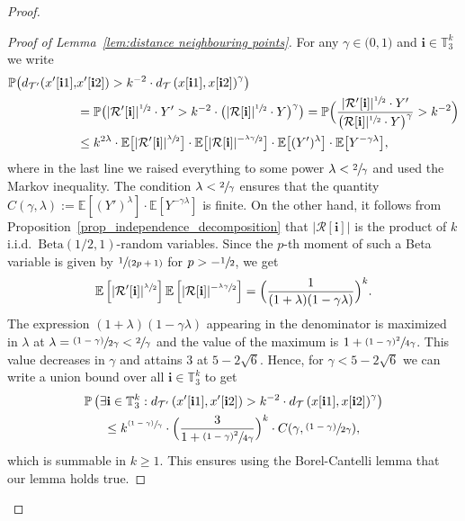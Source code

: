 \documentclass[11pt]{article}
\newcommand{\psfrac}[2]{\sfrac{(#1)}{#2}}
\newcommand{\spfrac}[2]{\sfrac{#1}{(#2)}}
\newcommand{\Ec}[1]{\mathbb{E} \left[#1\right]}
\newcommand{\bEc}[1]{\mathbb{E} \bigl[#1\bigr]}
\newcommand{\Pp}[1]{\mathbb{P} \left(#1\right)}
\newcommand{\bPp}[1]{\mathbb{P} \bigl(#1\bigr)}
\newcommand{\BPp}[1]{\mathbb{P} \Bigl(#1\Bigr)}
\newcommand{\intervalle}[4]{\mathopen{#1}#2\mathclose{}\mathpunct{},#3\mathclose{#4}}
\newcommand{\intervalleoo}[2]{\intervalle{(}{#1}{#2}{)}}
\newcommand{\Tt}{\mathcal{T}}
\newcommand{\ii}{\mathbf{i}}
\theoremstyle{plain}
\theoremstyle{definition}
\numberwithin{equation}{section}
\begin{document}
\begin{proof}
\begin{proof}[Proof of Lemma~\ref{lem:distance neighbouring points}]
For any $\gamma \in \intervalleoo{0}{1}$ and $\ii \in \mathbb{T}_3^k$ we write\vspace*{-3pt}
\begin{align*}
\bPp{d_{\Tt'}( x'[\ii1],&x'[\ii2])>k^{-2}\cdot d_{\Tt} \left( x[\ii1],x[\ii2] \right)^\gamma}\\
&= \bPp{|\mathcal{R}'[\ii]|^{\sfrac{1}{2}} \cdot Y' > k^{-2} \cdot \bigl(|\mathcal{R}[\ii]|^{\sfrac{1}{2}} \cdot Y\bigr)^\gamma}=\BPp{\frac{|\mathcal{R}'[\ii]|^{\sfrac{1}{2}} \cdot Y'}{ \left(\mathcal{R}[\ii]|^{\sfrac{1}{2}} \cdot Y\right)^\gamma}> k^{-2}}\\
&\leq k^{2\lambda} \cdot \bEc{|\mathcal{R}'[\ii]|^{\sfrac{\lambda}{2}}} \cdot \bEc{|\mathcal{R}[\ii]|^{-\sfrac{\lambda \gamma }{2}}} \cdot \bEc{(Y')^\lambda} \cdot \bEc{Y^{-\gamma \lambda}},
\end{align*}
where in the last line we raised everything to some power $\lambda<\sfrac{2}{\gamma}$ and used the Markov inequality. The condition $\lambda<\sfrac{2}{\gamma}$ ensures that the quantity $C(\gamma,\lambda):=\Ec{(Y')^\lambda} \cdot \Ec{Y^{-\gamma \lambda}}$ is finite.
On the other hand, it follows from Proposition~\ref{prop_independence_decomposition} that $|\mathcal{R}[\ii]|$ is the product of $k$ i.i.d.\ $\mathrm{Beta}(1/2,1)$-random variables.
Since the $p$-th moment of such a Beta variable is given by $\spfrac{1}{2p+1}$ for $p>-\sfrac{1}{2}$, we get\vspace*{-3pt}
\[
\Ec{|\mathcal{R}'[\ii]|^{\sfrac{\lambda}{2}}}\Ec{|\mathcal{R}[\ii]|^{-\sfrac{\lambda \gamma }{2}}} =\Bigl( \frac{1}{(1+\lambda)(1-\gamma \lambda)}\Bigr)^k.
\]
The expression $(1+\lambda)(1-\gamma \lambda)$ appearing in the denominator is maximized in $\lambda$ at $\lambda = \psfrac{1-\gamma}{2\gamma}<\sfrac{2}{\gamma}$ and the value of the maximum is $1+\sfrac{(1-\gamma)^2}{4\gamma}$.
This value decreases in $\gamma$ and attains $3$ at $5- 2\sqrt{6}$.
Hence, for $\gamma < 5-2\sqrt{6}$ we can write a union bound over all $\ii \in \mathbb{T}_3^k$ to get
\begin{multline*}
\Pp{ \exists \ii \in \mathbb{T}_3^k : d_{\Tt'} \left( x'[\ii1],x'[\ii2] \right)>k^{-2}\cdot d_{\Tt} \left( x[\ii1],x[\ii2]\right)^\gamma} \\ \leq k^{\psfrac{1-\gamma}{\gamma}} \cdot\Bigl(\frac{3}{1+\sfrac{(1-\gamma)^2}{4\gamma}} \Bigr)^k \cdot C(\gamma,\psfrac{1-\gamma}{2\gamma}),
\end{multline*}
which is summable in $k\geq 1$. This ensures using the Borel-Cantelli lemma that our lemma holds true.
\end{proof}


\end{proof}
\end{document}
